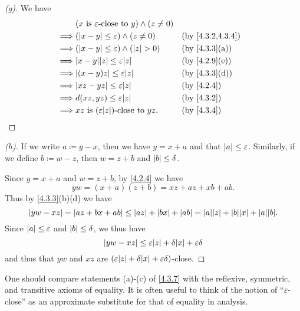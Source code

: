 \begin{proof}[(g)]
  We have
  \begin{align*}
             & (x \text{ is } \varepsilon\text{-close to } y) \land (z \neq 0)                       \\
    \implies & (\abs{x - y} \leq \varepsilon) \land (z \neq 0)                 &  & \by{4.3.2,4.3.4} \\
    \implies & (\abs{x - y} \leq \varepsilon) \land (\abs{z} > 0)              &  & \by{4.3.3}[a]    \\
    \implies & \abs{x - y} \abs{z} \leq \varepsilon \abs{z}                    &  & \by{4.2.9}[e]    \\
    \implies & \abs{(x - y)z} \leq \varepsilon \abs{z}                         &  & \by{4.3.3}[d]    \\
    \implies & \abs{xz - yz} \leq \varepsilon \abs{z}                          &  & \by{4.2.4}       \\
    \implies & d(xz, yz) \leq \varepsilon \abs{z}                              &  & \by{4.3.2}       \\
    \implies & xz \text{ is } (\varepsilon \abs{z})\text{-close to } yz.       &  & \by{4.3.4}
  \end{align*}
\end{proof}

\begin{proof}[(h)]
  If we write \(a \coloneqq y - x\), then we have \(y = x + a\) and that \(\left\lvert a\right\rvert \leq \varepsilon\).
  Similarly, if we define \(b \coloneqq w - z\), then \(w = z + b\) and \(\left\lvert b\right\rvert \leq \delta\).

  Since \(y = x + a\) and \(w = z + b\), by \cref{4.2.4} we have
  \[
    yw = (x + a)(z + b) = xz + az + xb + ab.
  \]
  Thus by \cref{4.3.3}(b)(d) we have
  \[
    \abs{yw - xz} = \abs{az + bx + ab} \leq \abs{az} + \abs{bx} + \abs{ab} = \abs{a}\abs{z} + \abs{b}\abs{x} + \abs{a}\abs{b}.
  \]
  Since \(\left\lvert a\right\rvert \leq \varepsilon\) and \(\left\lvert b\right\rvert \leq \delta\), we thus have
  \[
    \abs{yw - xz} \leq \varepsilon\abs{z} + \delta\abs{x} + \varepsilon\delta
  \]
  and thus that \(yw\) and \(xz\) are \((\varepsilon\abs{z} + \delta\abs{x} + \varepsilon\delta)\)-close.
\end{proof}

\begin{rmk}\label{4.3.8}
  One should compare statements (a)-(c) of \cref{4.3.7} with the reflexive, symmetric, and transitive axioms of equality.
  It is often useful to think of the notion of ``\(\varepsilon\)-close'' as an approximate substitute for that of equality in analysis.
\end{rmk}

